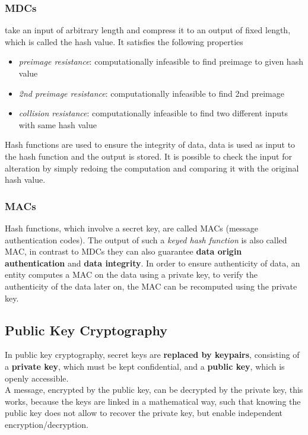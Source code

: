 \documentclass[a4paper, 10 pt, conference]{ieeeconf}
\begin{document}
\subsubsection{\textbf{MDCs}} 
take an input of arbitrary length and compress it to an output of fixed length, which is called the hash value. 
It satisfies the following properties
\begin{itemize}
\item \emph{preimage resistance}: computationally infeasible to find preimage to given hash value
\item \emph{2nd preimage resistance}: computationally infeasible to find 2nd preimage
\item \emph{collision resistance}: computationally infeasible to find two different inputs with same hash value
\end{itemize}
Hash functions are used to ensure the integrity of data, data is used as input to the hash function and the output is stored. It is possible to check the input for alteration by simply redoing the computation and comparing it with the original hash value. 

\subsubsection{\textbf{MACs}}
Hash functions, which involve a secret key, are called MACs (message authentication codes). The output of such a \emph{keyed hash function} is also called MAC, in contrast to MDCs they can also guarantee \textbf{data origin authentication} and \textbf{data integrity}. 
In order to ensure authenticity of data, an entity computes a MAC on the data using a private key, to verify the authenticity of the data later on, the MAC can be recomputed using the private key. 

\subsection{\textbf{Public Key Cryptography}}
In public key cryptography, secret keys are \textbf{replaced by keypairs}, consisting of a \textbf{private key}, which must be kept confidential, and a \textbf{public key}, which is openly accessible. \\
A message, encrypted by the public key, can be decrypted by the private key, this works, because the keys are linked in a mathematical way, such that knowing the public key does not allow to recover the private key, but enable independent encryption/decryption. 
\vspace{0.5cm}
\end{document}
